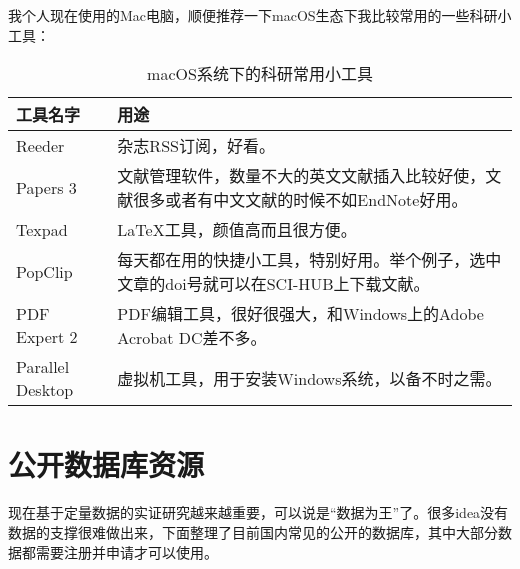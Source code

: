 \documentclass[11pt, a4paper]{article}
\begin{document}
我个人现在使用的Mac电脑，顺便推荐一下macOS生态下我比较常用的一些科研小工具：
\begin{table}[H]
\caption{macOS系统下的科研常用小工具}
	\centering
	\begin{threeparttable}
		\begin{tabular}{lp{10cm}}
			\toprule
			工具名字 & 用途 \\
			\midrule
			Reeder & 杂志RSS订阅，好看。 \\
			Papers 3 & 文献管理软件，数量不大的英文文献插入比较好使，文献很多或者有中文文献的时候不如EndNote好用。 \\
			Texpad & \LaTeX 工具，颜值高而且很方便。 \\
			PopClip & 每天都在用的快捷小工具，特别好用。举个例子，选中文章的doi号就可以在SCI-HUB上下载文献。\\
			PDF Expert 2 & PDF编辑工具，很好很强大，和Windows上的Adobe Acrobat DC差不多。\\
			Parallel Desktop & 虚拟机工具，用于安装Windows系统，以备不时之需。\\
			\bottomrule		
		\end{tabular}		
	\end{threeparttable}	
\end{table}




\section{公开数据库资源}
现在基于定量数据的实证研究越来越重要，可以说是“数据为王”了。很多idea没有数据的支撑很难做出来，下面整理了目前国内常见的公开的数据库，其中大部分数据都需要注册并申请才可以使用。
\end{document}
